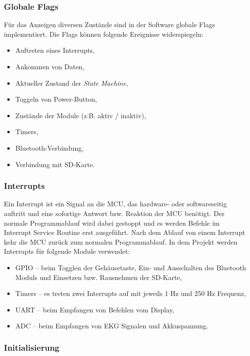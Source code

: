 \subsubsection{Globale Flags}

Für das Anzeigen diversen Zustände sind in der Software globale Flags implementiert. Die Flags können folgende Ereignisse widerspiegeln:
\begin{itemize}
    \item Auftreten eines Interrupts,
    \item Ankommen von Daten,
    \item Aktueller Zustand der \textit{State Machine},
    \item Toggeln von Power-Button,
    \item Zustände der Module (z.B. aktiv / inaktiv),
    \item Timers,
    \item Bluetooth-Verbindung,
    \item Verbindung mit SD-Karte.
\end{itemize} 

\subsubsection{Interrupts}

Ein Interrupt ist ein Signal an die MCU, das hardware- oder softwareseitig auftritt und eine sofortige Antwort bzw. Reaktion der MCU benötigt. Der normale Programmablauf wird dabei gestoppt und es werden Befehle im Interrupt Service Routine erst ausgeführt. Nach dem Ablauf von einem Interrupt kehr die MCU zurück zum normalen Programmablauf.
In dem Projekt werden Interrupts für folgende Module verwendet:
\begin{itemize}
    \item GPIO – beim Togglen der Gehäusetaste, Ein- und Ausschalten des Bluetooth Moduls und Einsetzen bzw. Rausnehmen der SD-Karte,
    \item Timers – es treten zwei Interrupts auf mit jeweils 1 Hz und 250 Hz Frequenz,
    \item UART – beim Empfangen von Befehlen vom Display,
    \item ADC – beim Empfangen von EKG Signalen und Akkuspannung.
\end{itemize} 

\subsubsection{Initialisierung}

